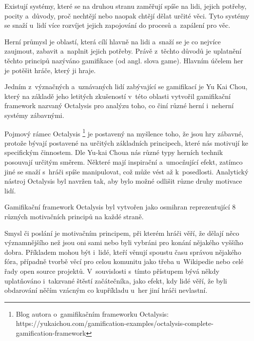 \documentclass[twoside, 12pt]{article}
\begin{document}
Existují systémy, které se na druhou stranu zaměřují spíše na lidi,
jejich potřeby, pocity a~důvody, proč nechtějí nebo naopak chtějí dělat určité věci.
Tyto systémy se snaží u~lidí více rozvíjet jejich zapojování do procesů
a~zapálení pro věc.

Herní průmysl je oblastí, která cílí hlavně na lidi a~snaží se je
co nejvíce zaujmout, zabavit a~naplnit jejich potřeby.
Právě z~těchto důvodů je uplatnění těchto principů nazýváno gamifikace (od angl. slova game).
Hlavním účelem her je potěšit hráče, který ji hraje. \cite{octalysis}


Jedním z~význačných a~uznávaných lidí zabývající se gamifikací je Yu Kai Chou,
který na základě jeho letitých zkušeností v~této oblasti vytvořil gamifikační
framework nazvaný Octalysis pro analýzu toho, co činí různé herní i~neherní systémy
zábavnými.

Pojmový rámec Octalysis
\footnote{Blog autora o~gamifikačním frameworku Octalysis:
https://yukaichou.com/gamification-examples/octalysis-complete-gamification-framework}
je postavený na myšlence toho,
že jsou hry zábavné, protože bývají postavené na určitých základních principech,
které nás motivují ke specifickým činnostem.
Dle Yu-kai Choua nás různé typy herních technik posouvají určitým směrem.
Některé mají inspirační a~umocňující efekt,
zatímco jiné se snaží s~hráči spíše manipulovat,
což může vést až k~posedlosti.
Analytický nástroj Octalysis byl navržen tak,
aby bylo možné odlišit různe druhy motivace lidí.

\clearpage

Gamifikační framework Octalysis byl vytvořen jako osmihran reprezentující
8 různých motivačních principů na každé straně.

\obrazek
{}


Smysl či poslání je motivačním principem, při kterém hráči
věří, že dělají něco významnějšího než jsou oni sami nebo
byli vybráni pro konání nějakého vyššího dobra.
Příkladem mohou být i~lidé, kteří věnují spoustu času správou nějakého
fóra, případně tvorbě věcí pro celou komunitu jako třeba u~Wikipedie nebo
celé řady open source projektů.
V~souvislosti s~tímto přístupem bývá někdy uplatňováno
i~takzvané štěstí začátečníka, jako efekt, kdy lidé věří,
že byli obdarování něčím vzácným co kupříkladu u~her jiní hráči nevlastní.
\end{document}
